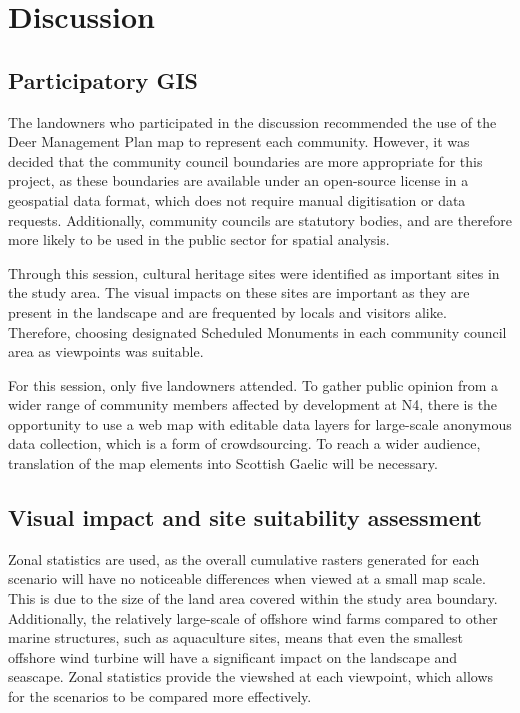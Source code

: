 \chapter{Discussion}

\section{Participatory GIS}

The landowners who participated in the discussion recommended the use of the Deer Management Plan map to represent each community. However, it was decided that the community council boundaries are more appropriate for this project, as these boundaries are available under an open-source license in a geospatial data format, which does not require manual digitisation or data requests. Additionally, community councils are statutory bodies, and are therefore more likely to be used in the public sector for spatial analysis.

Through this session, cultural heritage sites were identified as important sites in the study area. The visual impacts on these sites are important as they are present in the landscape and are frequented by locals and visitors alike. Therefore, choosing designated Scheduled Monuments in each community council area as viewpoints was suitable.

For this session, only five landowners attended. To gather public opinion from a wider range of community members affected by development at N4, there is the opportunity to use a web map with editable data layers for large-scale anonymous data collection, which is a form of crowdsourcing. To reach a wider audience, translation of the map elements into Scottish Gaelic will be necessary.

\section{Visual impact and site suitability assessment}

Zonal statistics are used, as the overall cumulative rasters generated for each scenario will have no noticeable differences when viewed at a small map scale. This is due to the size of the land area covered within the study area boundary. Additionally, the relatively large-scale of offshore wind farms compared to other marine structures, such as aquaculture sites, means that even the smallest offshore wind turbine will have a significant impact on the landscape and seascape. Zonal statistics provide the viewshed at each viewpoint, which allows for the scenarios to be compared more effectively.

